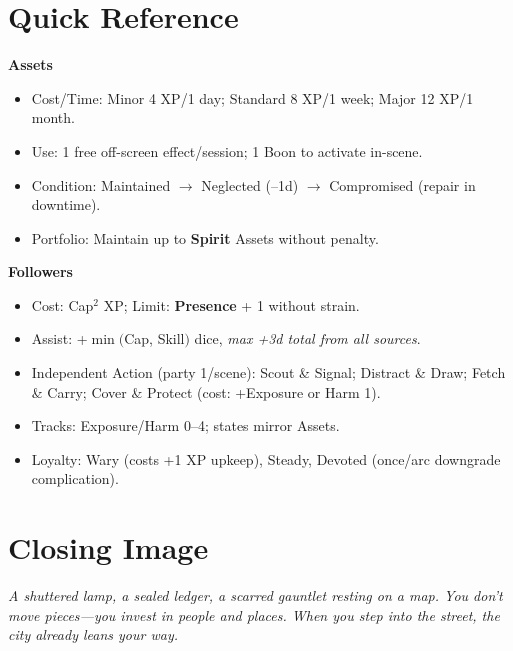 \section*{Quick Reference}
\begin{tcolorbox}[colback=blue!5!white,colframe=blue!75!black,title=Assets \& Followers Quick Reference,fonttitle=\bfseries]
\textbf{Assets}
\begin{itemize}
  \item Cost/Time: Minor 4 XP/1 day; Standard 8 XP/1 week; Major 12 XP/1 month.
  \item Use: 1 free off-screen effect/session; 1 Boon to activate in-scene.
  \item Condition: Maintained \(\rightarrow\) Neglected (–1d) \(\rightarrow\) Compromised (repair in downtime).
  \item Portfolio: Maintain up to \textbf{Spirit} Assets without penalty.
\end{itemize}

\textbf{Followers}
\begin{itemize}
  \item Cost: Cap\(^2\) XP; Limit: \textbf{Presence} + 1 without strain.
  \item Assist: +\(\min(\)Cap, Skill\()\) dice, \textit{max +3d total from all sources}.
  \item Independent Action (party 1/scene): Scout \& Signal; Distract \& Draw; Fetch \& Carry; Cover \& Protect (cost: +Exposure or Harm 1).
  \item Tracks: Exposure/Harm 0–4; states mirror Assets.
  \item Loyalty: Wary (costs +1 XP upkeep), Steady, Devoted (once/arc downgrade complication).
\end{itemize}
\end{tcolorbox}

\section*{Closing Image}
\textit{A shuttered lamp, a sealed ledger, a scarred gauntlet resting on a map. You don't move pieces—you invest in people and places. When you step into the street, the city already leans your way.}